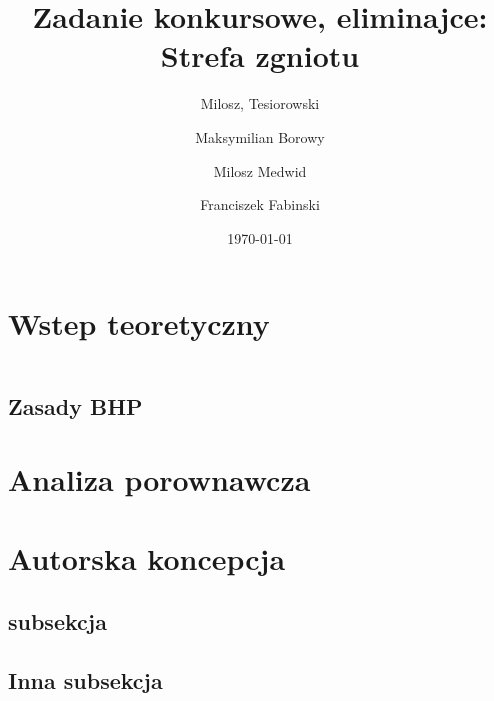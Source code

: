 \documentclass[a4paper,12pt]{article}  %
\title{Zadanie konkursowe, eliminajce:\\ Strefa zgniotu}
\author{
  Milosz, Tesiorowski\\
  \and
  Maksymilian Borowy\\
  \and
  Milosz Medwid\\
  \and
  Franciszek Fabinski\\
}
\date{\today}
\begin{document}
\maketitle  %

% 
% 

\section{Wstep teoretyczny}

\begin{equation}
\end{equation}


\subsection{Zasady BHP}

\section{Analiza porownawcza}

\section{Autorska koncepcja}
\subsection{subsekcja}
\subsection{Inna subsekcja}

\printbibliography
\end{document}
